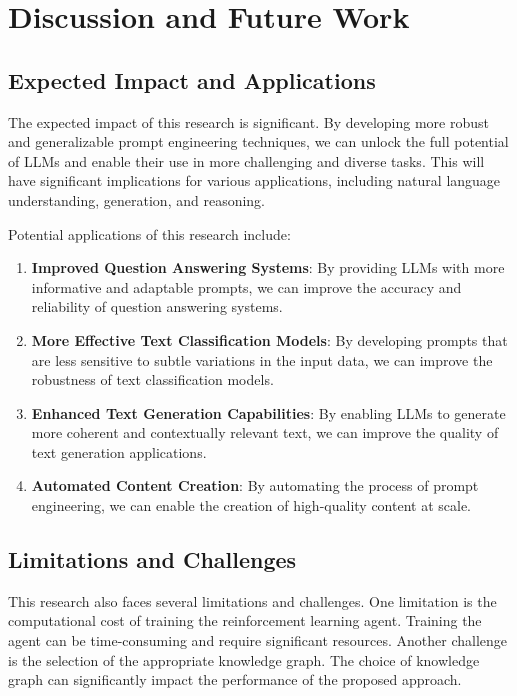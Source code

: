 \documentclass{article}
\begin{document}
\section{Discussion and Future Work}

\subsection{Expected Impact and Applications}

The expected impact of this research is significant. By developing more robust and generalizable prompt engineering techniques, we can unlock the full potential of LLMs and enable their use in more challenging and diverse tasks. This will have significant implications for various applications, including natural language understanding, generation, and reasoning.

Potential applications of this research include:

\begin{enumerate}
    \item \textbf{Improved Question Answering Systems}: By providing LLMs with more informative and adaptable prompts, we can improve the accuracy and reliability of question answering systems.
    \item \textbf{More Effective Text Classification Models}: By developing prompts that are less sensitive to subtle variations in the input data, we can improve the robustness of text classification models.
    \item \textbf{Enhanced Text Generation Capabilities}: By enabling LLMs to generate more coherent and contextually relevant text, we can improve the quality of text generation applications.
    \item \textbf{Automated Content Creation}: By automating the process of prompt engineering, we can enable the creation of high-quality content at scale.
\end{enumerate}

\subsection{Limitations and Challenges}

This research also faces several limitations and challenges. One limitation is the computational cost of training the reinforcement learning agent. Training the agent can be time-consuming and require significant resources. Another challenge is the selection of the appropriate knowledge graph. The choice of knowledge graph can significantly impact the performance of the proposed approach.
\end{document}

